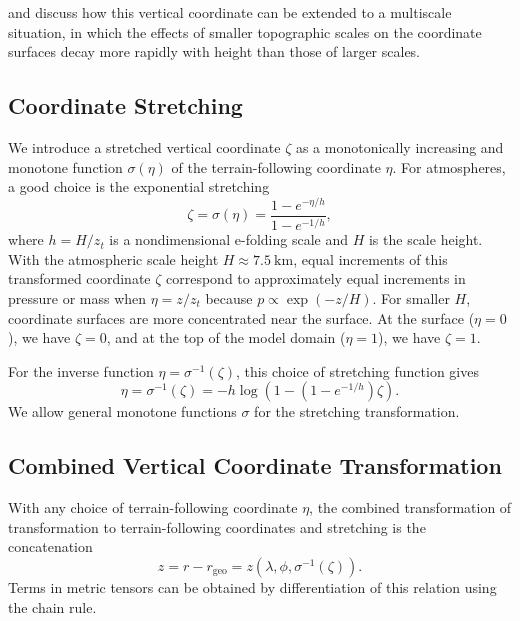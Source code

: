 \documentclass{report}
\begin{document}
\citet{Schar02a} and \citet{Leuenberger10q} discuss how this vertical coordinate can be extended to a multiscale situation, in which the effects of smaller topographic scales on the coordinate surfaces decay more rapidly with height than those of larger scales.  

\subsection{Coordinate Stretching} We introduce a stretched vertical coordinate $\zeta$ as a monotonically increasing and monotone function $\sigma(\eta)$ of the terrain-following coordinate $\eta$. For atmospheres, a good choice is the exponential stretching
\begin{equation}
    \zeta = \sigma(\eta) = \frac{1 - e^{-\eta/h}}{1-e^{-1/h}},
\end{equation}
where $h=H/z_t$ is a nondimensional e-folding scale and $H$ is the scale height. With the atmospheric scale height $H \approx 7.5~\mathrm{km}$, equal increments of this transformed coordinate $\zeta$ correspond to approximately equal increments in pressure or mass when $\eta = z/z_t$ because $p \propto \exp(-z/H)$. For smaller $H$, coordinate surfaces are more concentrated near the surface. At the surface ($\eta=0$), we have $\zeta=0$, and at the top of the model domain ($\eta=1$), we have $\zeta=1$.

For the inverse function $\eta = \sigma^{-1}(\zeta)$, this choice of stretching function gives
\begin{equation}
    \eta = \sigma^{-1}(\zeta) = - h \log\left(1-(1-e^{-1/h})\zeta\right).
\end{equation}
We allow general monotone functions $\sigma$ for the stretching transformation. 

\subsection{Combined Vertical Coordinate Transformation}

With any choice of terrain-following coordinate $\eta$, the combined transformation of  transformation to terrain-following coordinates and stretching is the concatenation
\begin{equation}
    z = r - r_\mathrm{geo} = z\left(\lambda, \phi, \sigma^{-1}(\zeta)\right).
\end{equation}
Terms in metric tensors can be obtained by differentiation of this relation using the chain rule. 
\end{document}
